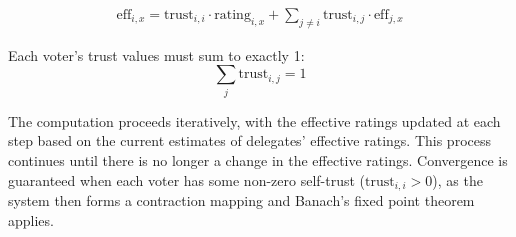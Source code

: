 \begin{gather}
  \text{eff}_{i,x} = \text{trust}_{i,i} \cdot \text{rating}_{i,x} + \sum_{j \neq i} \text{trust}_{i,j} \cdot \text{eff}_{j,x}
\end{gather}

Each voter's trust values must sum to exactly 1:
\[
\sum_{j} \text{trust}_{i,j} = 1
\]

The computation proceeds iteratively, with the effective ratings updated at each step based on the current estimates of delegates' effective ratings. This process continues until there is no longer a change in the effective ratings. Convergence is guaranteed when each voter has some non-zero self-trust (\( \text{trust}_{i,i} > 0 \)), as the system then forms a contraction mapping and Banach's fixed point theorem applies.







